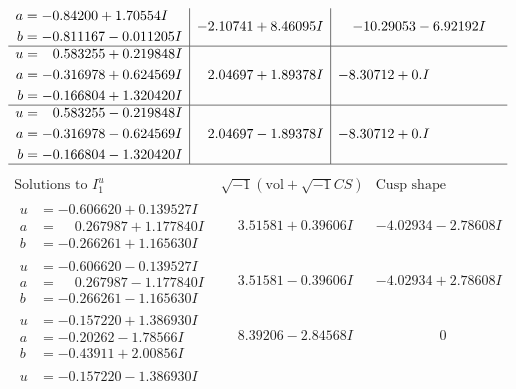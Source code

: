 \documentclass[1p]{elsarticle_modified}
\theoremstyle{definition}
\newcommand{\I}{\sqrt{-1}}
\begin{document}
$$\begin{array}{c|c|c}
\begin{aligned}
a &= -0.84200 + 1.70554 I \\
b &= -0.811167 - 0.011205 I\end{aligned}
 & -2.10741 + 8.46095 I & -10.29053 - 6.92192 I \\ \hline\begin{aligned}
u &= \phantom{-}0.583255 + 0.219848 I \\
a &= -0.316978 + 0.624569 I \\
b &= -0.166804 + 1.320420 I\end{aligned}
 & \phantom{-}2.04697 + 1.89378 I & -8.30712 + 0. I\phantom{ +0.000000I} \\ \hline\begin{aligned}
u &= \phantom{-}0.583255 - 0.219848 I \\
a &= -0.316978 - 0.624569 I \\
b &= -0.166804 - 1.320420 I\end{aligned}
 & \phantom{-}2.04697 - 1.89378 I & -8.30712 + 0. I\phantom{ +0.000000I}\\
 \hline 
 \end{array}$$\newpage$$\begin{array}{c|c|c}  
\text{Solutions to }I^u_{1}& \I (\text{vol} + \sqrt{-1}CS) & \text{Cusp shape}\\
 \hline 
\begin{aligned}
u &= -0.606620 + 0.139527 I \\
a &= \phantom{-}0.267987 + 1.177840 I \\
b &= -0.266261 + 1.165630 I\end{aligned}
 & \phantom{-}3.51581 + 0.39606 I & -4.02934 - 2.78608 I \\ \hline\begin{aligned}
u &= -0.606620 - 0.139527 I \\
a &= \phantom{-}0.267987 - 1.177840 I \\
b &= -0.266261 - 1.165630 I\end{aligned}
 & \phantom{-}3.51581 - 0.39606 I & -4.02934 + 2.78608 I \\ \hline\begin{aligned}
u &= -0.157220 + 1.386930 I \\
a &= -0.20262 - 1.78566 I \\
b &= -0.43911 + 2.00856 I\end{aligned}
 & \phantom{-}8.39206 - 2.84568 I & \phantom{-0.000000 } 0 \\ \hline\begin{aligned}
u &= -0.157220 - 1.386930 I \\

\end{aligned}
\end{array}$$
\end{document}
